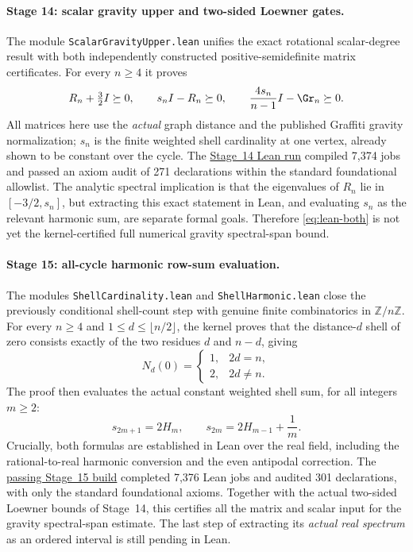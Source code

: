 \paragraph{Stage 14: scalar gravity upper and two-sided Loewner gates.}
The module \texttt{ScalarGravityUpper.lean} unifies the exact
rotational scalar-degree result with both independently constructed
positive-semidefinite matrix certificates. For every $n\ge4$ it proves
\begin{equation}\label{eq:lean-both}
R_n+\tfrac32I\succeq0,\qquad s_nI-R_n\succeq0,\qquad
\frac{4s_n}{n-1}I-\Gr_n\succeq0.
\end{equation}
All matrices here use the \emph{actual} graph distance and the
published Graffiti gravity normalization; $s_n$ is the finite
weighted shell cardinality at one vertex, already shown to be
constant over the cycle. The
\href{https://github.com/tonynewton79-web/newton-400-conjectures/actions/runs/39158362887}{Stage~14 Lean run}
compiled 7,374 jobs and passed an axiom audit of
271 declarations within the standard foundational allowlist.
The analytic spectral implication is that the eigenvalues of $R_n$
lie in $[-3/2,s_n]$, but extracting this exact statement in Lean,
and evaluating $s_n$ as the relevant harmonic sum, are separate
formal goals. Therefore \eqref{eq:lean-both} is not yet the
kernel-certified full numerical gravity spectral-span bound.


\paragraph{Stage 15: all-cycle harmonic row-sum evaluation.}
The modules \texttt{ShellCardinality.lean} and
\texttt{ShellHarmonic.lean} close the previously conditional
shell-count step with genuine finite combinatorics in
$\mathbb Z/n\mathbb Z$. For every $n\ge4$ and
$1\le d\le\lfloor n/2\rfloor$, the kernel proves
that the distance-$d$ shell of zero consists exactly of
the two residues $d$ and $n-d$, giving
\begin{equation}\label{eq:lean-shell-count}
N_d(0)=\begin{cases}1,&2d=n,\\2,&2d\ne n.\end{cases}
\end{equation}
The proof then evaluates the actual constant weighted
shell sum, for all integers $m\ge2$:
\begin{equation}\label{eq:lean-harmonic-scalar}
s_{2m+1}=2H_m,\qquad
s_{2m}=2H_{m-1}+\frac1m.
\end{equation}
Crucially, both formulas are established in Lean
over the real field, including the rational-to-real
harmonic conversion and the even antipodal correction.
The \href{https://github.com/tonynewton79-web/newton-400-conjectures/actions/runs/39160177061}{passing Stage~15 build}
completed 7,376 Lean jobs and audited 301 declarations,
with only the standard foundational axioms.
Together with the actual two-sided Loewner bounds of
Stage~14, this certifies all the matrix and scalar input
for the gravity spectral-span estimate. The last step
of extracting its \emph{actual real spectrum} as an
ordered interval is still pending in Lean.

